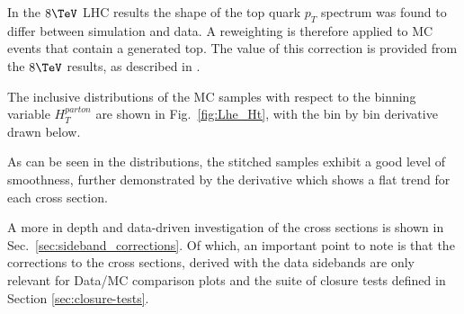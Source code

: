In the $8\tev$ LHC results the shape of the top quark $p_{T}$ spectrum
was found to differ between simulation and data. A reweighting is
therefore applied to MC events that contain a generated top. The value of
this correction is provided from the $8\tev$ results, as described in
\cite{twiki-TopPtReweighting}.

The inclusive distributions of the MC samples
with respect to the binning variable
$H_{T}^{parton}$ are shown in Fig.~\ref{fig:Lhe_Ht}, with
the bin by bin derivative drawn below.

As can be seen in the distributions, the stitched samples
exhibit a good level of smoothness,
further demonstrated by the derivative which shows a flat trend for each 
cross section.

A more in depth and data-driven investigation of the cross sections is shown in Sec.~\ref{sec:sideband_corrections}. 
Of which, an important point to note is that the corrections to the cross sections, 
derived with the data sidebands are only relevant for Data/MC comparison plots and the suite of closure tests defined in Section \ref{sec:closure-tests}.

